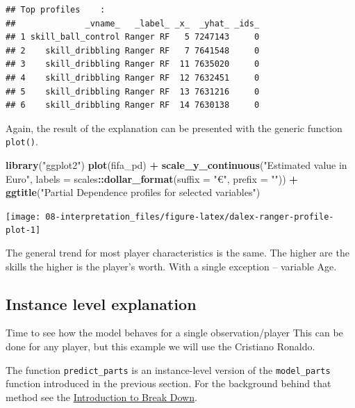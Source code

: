 \documentclass[]{scrbook}
\newenvironment{Shaded}{\begin{snugshade}}{\end{snugshade}}
\newcommand{\DataTypeTok}[1]{\textcolor[rgb]{0.13,0.29,0.53}{#1}}
\newcommand{\KeywordTok}[1]{\textcolor[rgb]{0.13,0.29,0.53}{\textbf{#1}}}
\newcommand{\NormalTok}[1]{#1}
\newcommand{\OperatorTok}[1]{\textcolor[rgb]{0.81,0.36,0.00}{\textbf{#1}}}
\newcommand{\StringTok}[1]{\textcolor[rgb]{0.31,0.60,0.02}{#1}}
\renewenvironment{Shaded} {\begin{snugshade}\small} {\end{snugshade}}
\begin{document}
\begin{verbatim}
## Top profiles    : 
##              _vname_   _label_ _x_  _yhat_ _ids_
## 1 skill_ball_control Ranger RF   5 7247143     0
## 2    skill_dribbling Ranger RF   7 7641548     0
## 3    skill_dribbling Ranger RF  11 7635020     0
## 4    skill_dribbling Ranger RF  12 7632451     0
## 5    skill_dribbling Ranger RF  13 7631216     0
## 6    skill_dribbling Ranger RF  14 7630138     0
\end{verbatim}

Again, the result of the explanation can be presented with the generic function \texttt{plot()}.

\begin{Shaded}
\begin{Highlighting}[]
\KeywordTok{library}\NormalTok{(}\StringTok{"ggplot2"}\NormalTok{)}
\KeywordTok{plot}\NormalTok{(fifa_pd) }\OperatorTok{+}
\StringTok{  }\KeywordTok{scale_y_continuous}\NormalTok{(}\StringTok{"Estimated value in Euro"}\NormalTok{, }\DataTypeTok{labels =}\NormalTok{ scales}\OperatorTok{::}\KeywordTok{dollar_format}\NormalTok{(}\DataTypeTok{suffix =} \StringTok{"€"}\NormalTok{, }\DataTypeTok{prefix =} \StringTok{""}\NormalTok{)) }\OperatorTok{+}
\StringTok{  }\KeywordTok{ggtitle}\NormalTok{(}\StringTok{"Partial Dependence profiles for selected variables"}\NormalTok{)}
\end{Highlighting}
\end{Shaded}

\begin{center}\texttt{[image: 08-interpretation\_files/figure-latex/dalex-ranger-profile-plot-1]} \end{center}

The general trend for most player characteristics is the same. The higher are the skills the higher is the player's worth. With a single exception -- variable Age.

\hypertarget{interpretability-instance-level}{%
\subsection{Instance level explanation}\label{interpretability-instance-level}}

Time to see how the model behaves for a single observation/player
This can be done for any player, but this example we will use the Cristiano Ronaldo.

The function \texttt{predict\_parts} is an instance-level version of the \texttt{model\_parts} function introduced in the previous section. For the background behind that method see the \href{https://pbiecek.github.io/ema/breakDown.html}{Introduction to Break Down}.
\end{document}
